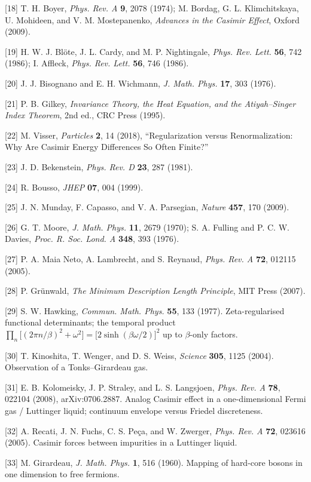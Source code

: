 \documentclass[11pt,letterpaper]{article}
\begin{document}
\begin{sloppypar}
[18] T. H. Boyer, \emph{Phys. Rev. A} \textbf{9}, 2078 (1974); M. Bordag, G. L. Klimchitskaya, U. Mohideen, and V. M. Mostepanenko, \emph{Advances in the Casimir Effect}, Oxford (2009).


[19] H. W. J. Blöte, J. L. Cardy, and M. P. Nightingale, \emph{Phys. Rev. Lett.} \textbf{56}, 742 (1986); I. Affleck, \emph{Phys. Rev. Lett.} \textbf{56}, 746 (1986).


[20] J. J. Bisognano and E. H. Wichmann, \emph{J. Math. Phys.} \textbf{17}, 303 (1976).


[21] P. B. Gilkey, \emph{Invariance Theory, the Heat Equation, and the Atiyah–Singer Index Theorem}, 2nd ed., CRC Press (1995).


[22] M. Visser, \emph{Particles} \textbf{2}, 14 (2018), “Regularization versus Renormalization: Why Are Casimir Energy Differences So Often Finite?”


[23] J. D. Bekenstein, \emph{Phys. Rev. D} \textbf{23}, 287 (1981).


[24] R. Bousso, \emph{JHEP} \textbf{07}, 004 (1999).


[25] J. N. Munday, F. Capasso, and V. A. Parsegian, \emph{Nature} \textbf{457}, 170 (2009).


[26] G. T. Moore, \emph{J. Math. Phys.} \textbf{11}, 2679 (1970); S. A. Fulling and P. C. W. Davies, \emph{Proc. R. Soc. Lond. A} \textbf{348}, 393 (1976).


[27] P. A. Maia Neto, A. Lambrecht, and S. Reynaud, \emph{Phys. Rev. A} \textbf{72}, 012115 (2005).


[28] P. Grünwald, \emph{The Minimum Description Length Principle}, MIT Press (2007).


[29] S. W. Hawking, \emph{Commun. Math. Phys.} \textbf{55}, 133 (1977). Zeta-regularised functional determinants; the temporal product \(\prod_n\bigl[(2\pi n/\beta)^2+\omega^2\bigr]=\bigl[2\sinh(\beta\omega/2)\bigr]^2\) up to \(\beta\)-only factors.


[30] T. Kinoshita, T. Wenger, and D. S. Weiss, \emph{Science} \textbf{305}, 1125 (2004). Observation of a Tonks–Girardeau gas.


[31] E. B. Kolomeisky, J. P. Straley, and L. S. Langsjoen, \emph{Phys. Rev. A} \textbf{78}, 022104 (2008), arXiv:0706.2887. Analog Casimir effect in a one-dimensional Fermi gas / Luttinger liquid; continuum envelope versus Friedel discreteness.


[32] A. Recati, J. N. Fuchs, C. S. Peça, and W. Zwerger, \emph{Phys. Rev. A} \textbf{72}, 023616 (2005). Casimir forces between impurities in a Luttinger liquid.


[33] M. Girardeau, \emph{J. Math. Phys.} \textbf{1}, 516 (1960). Mapping of hard-core bosons in one dimension to free fermions.

\end{sloppypar}
\end{document}
